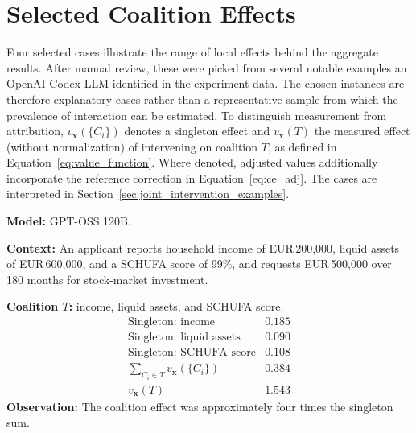 \section{Selected Coalition Effects}
\label{sec:results-coalition-examples}

Four selected cases illustrate the range of local effects behind the aggregate results. After manual review, these were picked from several notable examples an OpenAI Codex LLM identified in the experiment data. The chosen instances are therefore explanatory cases rather than a representative sample from which the prevalence of interaction can be estimated. To distinguish measurement from attribution, $v_{\mathbf{x}}(\{C_i\})$ denotes a singleton effect and $v_{\mathbf{x}}(T)$ the measured effect (without normalization) of intervening on coalition $T$, as defined in Equation~\ref{eq:value_function}. Where denoted, adjusted values additionally incorporate the reference correction in Equation~\ref{eq:ce_adj}. The cases are interpreted in Section~\ref{sec:joint_intervention_examples}.

\begin{example_box}[title={Interaction case \thetcbcounter: New German Credit, question 4},label={ex:new_german_credit_threshold},fontupper=\small,arc=2mm,boxrule=0.3mm,breakable=false,colframe=BoxResultBlue!75!black,colback=BoxResultBlue!5!white,before upper app={\abovedisplayskip=1pt\belowdisplayskip=2pt\abovedisplayshortskip=0pt\belowdisplayshortskip=3pt}]
	\textbf{Model:} GPT-OSS 120B.

	\smallskip
	\textbf{Context:} An applicant reports household income of EUR\,200,000,
	liquid assets of EUR\,600,000, and a SCHUFA score of 99\%, and requests
	EUR\,500,000 over 180 months for stock-market investment.

	\smallskip
	\textbf{Coalition $T$:} income, liquid assets, and SCHUFA score.
	\[
		\begin{array}{lr}
			\text{Singleton: income}               & 0.185 \\
			\text{Singleton: liquid assets}        & 0.090 \\
			\text{Singleton: SCHUFA score}         & 0.108 \\
			\hline
			\sum_{C_i\in T}v_{\mathbf{x}}(\{C_i\}) & 0.384 \\
			v_{\mathbf{x}}(T)                      & 1.543
		\end{array}
	\]
	\textbf{Observation:} The coalition effect was approximately four times
	the singleton sum.
\end{example_box}

